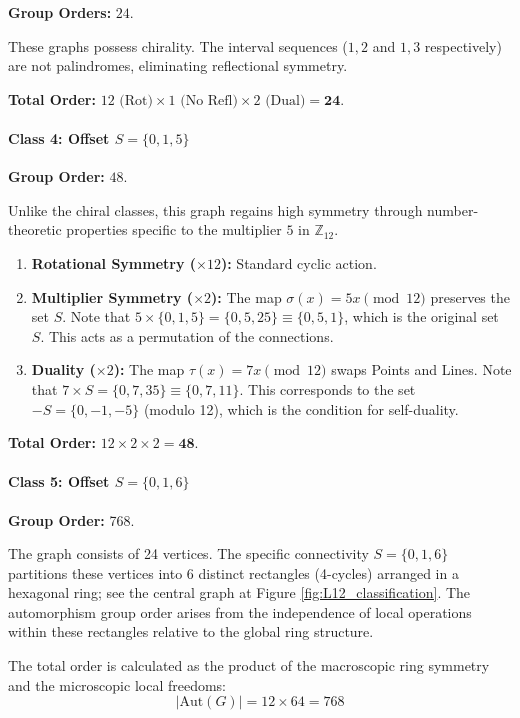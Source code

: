 \documentclass[12pt,letterpaper]{amsart}
\begin{document}
\textbf{Group Orders:} $24$.

These graphs possess chirality. The interval sequences ($1,2$ and $1,3$ respectively) are not palindromes, eliminating reflectional symmetry.

\textbf{Total Order:} $12 \text{ (Rot)} \times 1 \text{ (No Refl)} \times 2 \text{ (Dual)} = \mathbf{24}$.

\paragraph{\bf Class 4: Offset  $S = \{0, 1, 5\}$}


\textbf{Group Order:} $48$.

Unlike the chiral classes, this graph regains high symmetry through number-theoretic properties specific to the multiplier $5$ in $\mathbb{Z}_{12}$.
\begin{enumerate}
    \item \textbf{Rotational Symmetry ($\times 12$):} Standard cyclic action.
    \item \textbf{Multiplier Symmetry ($\times 2$):} The map $\sigma(x) = 5x \pmod{12}$ preserves the set $S$. Note that $5 \times \{0, 1, 5\} = \{0, 5, 25\} \equiv \{0, 5, 1\}$, which is the original set $S$. This acts as a permutation of the connections.
    \item \textbf{Duality ($\times 2$):} The map $\tau(x) = 7x \pmod{12}$ swaps Points and Lines. Note that $7 \times S = \{0, 7, 35\} \equiv \{0, 7, 11\}$. This corresponds to the set $-S = \{0, -1, -5\}$ (modulo 12), which is the condition for self-duality.
\end{enumerate}

\textbf{Total Order:} $12 \times 2 \times 2 = \mathbf{48}$.

\paragraph{\bf Class 5: Offset $S = \{0, 1, 6\}$}


\textbf{Group Order:} 768.

The graph consists of 24 vertices. The specific connectivity $S=\{0,1,6\}$ partitions these vertices into 6 distinct rectangles (4-cycles) arranged in a hexagonal ring; see the central graph at Figure \ref{fig:L12_classification}. The automorphism group order arises from the independence of local operations within these rectangles relative to the global ring structure.

The total order is calculated as the product of the macroscopic ring symmetry and the microscopic local freedoms:
$$ |\mathrm{Aut}(G)| = 12 \times 64 = 768 $$
\end{document}
